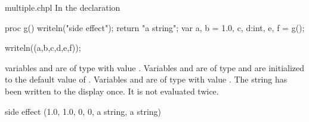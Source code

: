 \begin{chapelexample}{multiple.chpl}
In the declaration
\begin{chapel}
proc g() { writeln("side effect"); return "a string"; }
var a, b = 1.0, c, d:int, e, f = g();
\end{chapel}
\begin{chapelpost}
writeln((a,b,c,d,e,f));
\end{chapelpost}
variables  and  are of type  with
value .  Variables  and  are of
type  and are initialized to the default value of .
Variables  and  are of type  with
value .  The string  has been
written to the display once.  It is not evaluated twice.
\begin{chapeloutput}
side effect
(1.0, 1.0, 0, 0, a string, a string)
\end{chapeloutput}
\end{chapelexample}

